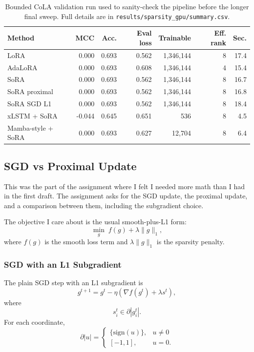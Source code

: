 \documentclass[11pt]{article}
\begin{document}
\begin{table}[h]
\centering
\small
\begin{tabular}{lrrrrrr}
\toprule
Method & MCC & Acc. & Eval loss & Trainable & Eff. rank & Sec. \\
\midrule
LoRA & 0.000 & 0.693 & 0.562 & 1,346,144 & 8 & 17.4 \\
AdaLoRA & 0.000 & 0.693 & 0.608 & 1,346,144 & 4 & 15.4 \\
SoRA & 0.000 & 0.693 & 0.562 & 1,346,144 & 8 & 16.7 \\
SoRA proximal & 0.000 & 0.693 & 0.562 & 1,346,144 & 8 & 16.8 \\
SoRA SGD L1 & 0.000 & 0.693 & 0.562 & 1,346,144 & 8 & 18.4 \\
xLSTM + SoRA & -0.044 & 0.645 & 0.651 & 536 & 8 & 4.5 \\
Mamba-style + SoRA & 0.000 & 0.693 & 0.627 & 12,704 & 8 & 6.4 \\
\bottomrule
\end{tabular}
\caption{Bounded CoLA validation run used to sanity-check the pipeline before the longer final sweep. Full details are in \texttt{results/sparsity\_gpu/summary.csv}.}
\label{tab:sparsity-bounded}
\end{table}

\subsection{SGD vs Proximal Update}
This was the part of the assignment where I felt I needed more math than I had in the first draft. The assignment asks for the SGD update, the proximal update, and a comparison between them, including the subgradient choice.

The objective I care about is the usual smooth-plus-L1 form:
\[
  \min_g \; f(g) + \lambda \|g\|_1,
\]
where $f(g)$ is the smooth loss term and $\lambda \|g\|_1$ is the sparsity penalty.

\subsubsection{SGD with an L1 Subgradient}
The plain SGD step with an L1 subgradient is
\[
  g^{t+1} = g^t - \eta \left(\nabla f(g^t) + \lambda s^t\right),
\]
where
\[
  s_i^t \in \partial |g_i^t|.
\]
For each coordinate,
\[
  \partial |u| =
  \begin{cases}
    \{\mathrm{sign}(u)\}, & u \neq 0 \\
    [-1, 1], & u = 0.
  \end{cases}
\]
\end{document}
